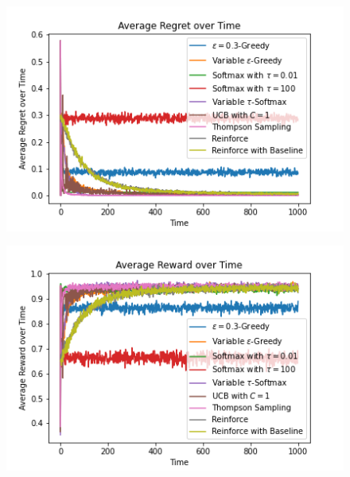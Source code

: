 \documentclass{article}
\begin{document}
			\begin{figure}[H]
			\graphicspath{ {../Experiments/Normal_2_0.01_every_case/} }
			\centering
			\begin{minipage}{.5\textwidth}
			  \centering
			  \includegraphics[width=\linewidth]{Average_Regret_over_Time.png}
			  \label{fig:test1}
			\end{minipage}%
			\begin{minipage}{.5\textwidth}
			  \centering
			  \includegraphics[width=\linewidth]{Average_Reward_over_Time.png}
			  \label{fig:test2}
			\end{minipage}
			\end{figure}
\end{document}
